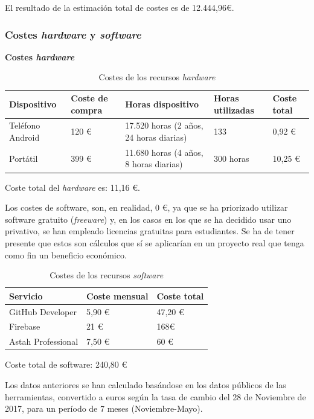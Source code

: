 \documentclass[twoside]{report}
\begin{document}
El resultado de la estimación total de costes es de 12.444,96\euro.

\subsubsection{Costes \textit{hardware} y \textit{software}}
\textbf{Costes \textit{hardware}}
\begin{table}[H]
\center
\begin{tabular}{|l|l|l|l|l|}
\hline
Dispositivo        & Coste de compra   & Horas dispositivo & Horas utilizadas & Coste total \\ \hline
Teléfono Android   & 120 \euro      & 17.520 horas (2 años, 24 horas diarias)  & 133  & 0,92  \euro \\ \hline
Portátil      & 399 \euro   &  11.680 horas (4 años, 8 horas diarias) & 300 horas  & 10,25 \euro \\ \hline
\end{tabular}
\caption{Costes de los recursos \textit{hardware}}
\end{table}

Coste total del \textit{hardware} es: 11,16 \euro.

Los costes de software, son, en realidad, 0 \euro, ya que se ha priorizado utilizar software gratuito (\textit{freeware}) y,  en los casos en los que se ha decidido usar uno privativo, se han empleado licencias gratuitas para estudiantes. Se ha de tener presente que estos son cálculos que sí se aplicarían en un proyecto real que tenga como fin un beneficio económico.

\begin{table}[H]
\centering
\begin{tabular}{|l|l|l|}
\hline
Servicio         & Coste mensual & Coste total \\ \hline
GitHub Developer & 5,90 \euro        & 47,20 \euro          \\ \hline
Firebase         & 21 \euro      & 168\euro           \\ \hline
Astah Professional & 7,50 \euro & 60 \euro \\ \hline
\end{tabular}
\caption{Costes de los recursos \textit{software}}
\end{table}

Coste total de software: 240,80 \euro

Los datos anteriores se han calculado basándose en los datos públicos de las herramientas, convertido a euros según la tasa de cambio del 28 de Noviembre de 2017, para un período de 7 meses (Noviembre-Mayo).
\end{document}

